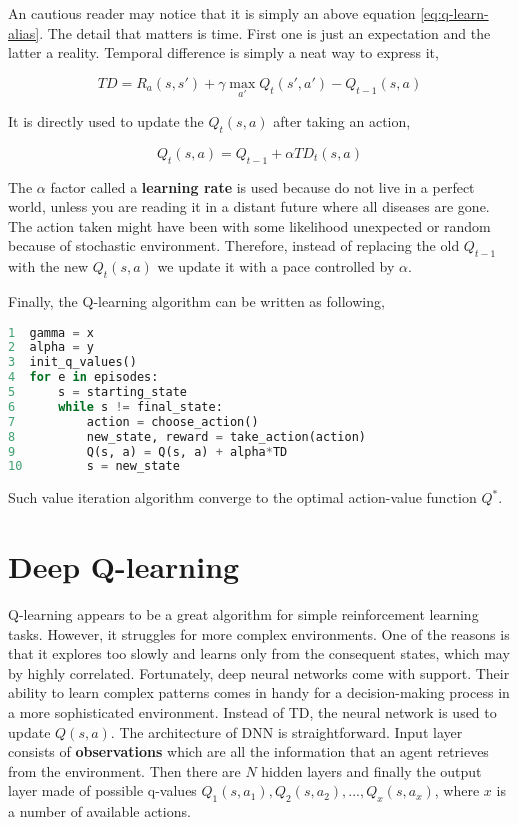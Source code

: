 An cautious reader may notice that it is simply an above equation \ref{eq:q-learn-alias}. The detail that matters is time. First one is just an expectation and the latter a reality. Temporal difference is simply a neat way to express it,

\begin{equation}
    TD = R_a(s, s') + \gamma \max_{a'} Q_{t}(s', a') - Q_{t-1}(s, a)
\label{eq:temporal-difference}
\end{equation}

It is directly used to update the $Q_t(s, a)$ after taking an action,

\begin{equation}
    Q_t(s, a) = Q_{t-1} + \alpha TD_t(s, a)
\end{equation}

The $\alpha$ factor called a \textbf{learning rate} is used because do not live in a perfect world, unless you are reading it in a distant future where all diseases are gone. The action taken might have been with some likelihood unexpected or random because of stochastic environment. Therefore, instead of replacing the old $Q_{t-1}$ with the new $Q_t(s, a)$ we update it with a pace controlled by $\alpha$.

\vspace{.5cm}

Finally, the Q-learning algorithm can be written as following,

\begin{lstlisting}[language=Python, caption={Q-learning algorithm}]
1  gamma = x
2  alpha = y
3  init_q_values()
4  for e in episodes:
5      s = starting_state
6      while s != final_state:
7          action = choose_action()
8          new_state, reward = take_action(action)
9          Q(s, a) = Q(s, a) + alpha*TD
10         s = new_state
\end{lstlisting}

Such value iteration algorithm converge to the optimal action-value function $Q^*$.

\section{Deep Q-learning}
\label{sec:deep-q-learn}

Q-learning appears to be a great algorithm for simple reinforcement learning tasks. However, it struggles for more complex environments. One of the reasons is that it explores too slowly and learns only from the consequent states, which may by highly correlated. Fortunately, deep neural networks come with support. Their ability to learn complex patterns comes in handy for a decision-making process in a more sophisticated environment. Instead of TD, the neural network is used to update $Q(s, a)$. The architecture of DNN is straightforward. Input layer consists of \textbf{observations} which are all the information that an agent retrieves from the environment. Then there are $N$ hidden layers and finally the output layer made of possible q-values $Q_1(s, a_1), Q_2(s, a_2), ..., Q_x(s, a_x)$, where $x$ is a number of available actions.

